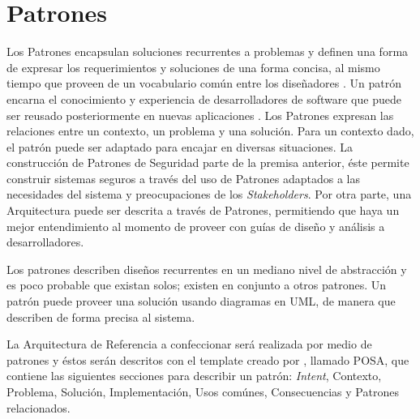 \section{Patrones}
\label{chap2:Patt}
Los Patrones encapsulan soluciones recurrentes a problemas y definen una forma de expresar los requerimientos y soluciones de una forma concisa, al mismo tiempo que proveen de un vocabulario común entre los diseñadores \cite{buschman1996system}. Un patrón encarna el conocimiento y experiencia de desarrolladores de software que puede ser reusado posteriormente en nuevas aplicaciones \cite{fernandez2004methodology, Fernandez2006, Fernandez2011, fernandez2013security}. Los Patrones expresan las relaciones entre un contexto, un problema y una solución. Para un contexto dado, el patrón puede ser adaptado para encajar en diversas situaciones. La construcción de Patrones de Seguridad parte de la premisa anterior, éste permite construir sistemas seguros a través del uso de Patrones adaptados a las necesidades del sistema y preocupaciones de los \textit{Stakeholders}. Por otra parte, una Arquitectura puede ser descrita a través de Patrones, permitiendo que haya un mejor entendimiento al momento de proveer con guías de diseño y análisis a desarrolladores.

Los patrones describen diseños recurrentes en un mediano nivel de abstracción y es poco probable que existan solos; existen en conjunto a otros patrones. Un patrón puede proveer una solución usando diagramas en UML, de manera que describen de forma precisa al sistema.

La Arquitectura de Referencia a confeccionar será realizada por medio de patrones y éstos serán descritos con el template creado por \cite{buschman1996system}, llamado POSA, que contiene las siguientes secciones para describir un patrón: \textit{Intent}, Contexto, Problema, Solución, Implementación, Usos comúnes, Consecuencias y Patrones relacionados.






